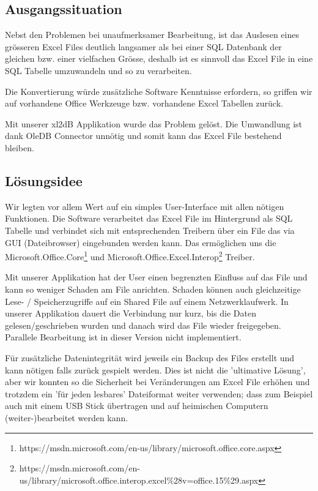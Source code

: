 \documentclass{article}
\begin{document}
\subsection{Ausgangssituation}
Nebst den Problemen bei unaufmerksamer Bearbeitung, ist das Auslesen eines grösseren Excel Files deutlich langsamer als bei einer SQL Datenbank der gleichen bzw. einer vielfachen Grösse, deshalb ist es sinnvoll das Excel File in eine SQL Tabelle umzuwandeln und so zu verarbeiten.

Die Konvertierung würde zusätzliche Software Kenntnisse erfordern, so griffen wir auf vorhandene Office Werkzeuge bzw. vorhandene Excel Tabellen zurück.

Mit unserer xl2dB Applikation wurde das Problem gelöst. Die Umwandlung ist dank OleDB Connector unnötig und somit kann das Excel File bestehend bleiben.

\subsection{Lösungsidee}
Wir legten vor allem Wert auf ein simples User-Interface mit allen nötigen Funktionen. Die Software verarbeitet das Excel File im Hintergrund als SQL Tabelle und verbindet sich mit entsprechenden Treibern über ein File das via GUI (Dateibrowser) eingebunden werden kann. Das ermöglichen uns die Microsoft.Office.Core\footnote{https://msdn.microsoft.com/en-us/library/microsoft.office.core.aspx}  und Microsoft.Office.Excel.Interop\footnote{https://msdn.microsoft.com/en-us/library/microsoft.office.interop.excel\%28v=office.15\%29.aspx} Treiber.

Mit unserer Applikation hat der User einen begrenzten Einfluss auf das File und kann so weniger Schaden am File anrichten. Schaden können auch gleichzeitige Lese- / Speicherzugriffe auf ein Shared File auf einem Netzwerklaufwerk. In unserer Applikation dauert die Verbindung nur kurz, bis die Daten gelesen/geschrieben wurden und danach wird das File wieder freigegeben. Parallele Bearbeitung ist in dieser Version nicht implementiert.

Für zusätzliche Datenintegrität wird jeweils ein Backup des Files erstellt und kann nötigen falls zurück gespielt werden. Dies ist nicht die 'ultimative Lösung', aber wir konnten so die Sicherheit bei Veränderungen am Excel File erhöhen und trotzdem ein 'für jeden lesbares' Dateiformat weiter verwenden; dass zum Beispiel auch mit einem USB Stick übertragen und auf heimischen Computern (weiter-)bearbeitet werden kann.
\end{document}
